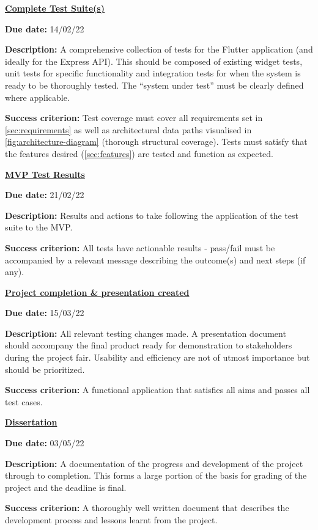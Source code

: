\textbf{\underline{Complete Test Suite(s)}}
\par
\textbf{Due date:} 14/02/22
\par
\vspace{-3mm}
\textbf{Description:} A comprehensive collection of tests for the Flutter application (and ideally for the Express API).
This should be composed of existing widget tests, unit tests for specific functionality and
integration tests for when the system is ready to be thoroughly tested. The ``system under test'' must be clearly defined where applicable.
\par
\vspace{-3mm}
\textbf{Success criterion:} Test coverage must cover all requirements set in \cref{sec:requirements} as well as architectural data paths
visualised in \cref{fig:architecture-diagram} (thorough structural coverage). Tests must satisfy that the features desired (\cref{sec:features}) are
tested and function as expected.
\par

\textbf{\underline{MVP Test Results}}
\par
\textbf{Due date:} 21/02/22
\par
\vspace{-3mm}
\textbf{Description:} Results and actions to take following the application of the test suite to the MVP.
\par
\vspace{-3mm}
\textbf{Success criterion:} All tests have actionable results - pass/fail must be accompanied by a relevant message describing
the outcome(s) and next steps (if any).
\par

\textbf{\underline{Project completion \& presentation created}}
\par
\textbf{Due date:} 15/03/22
\par
\vspace{-3mm}
\textbf{Description:} All relevant testing changes made. A presentation document should accompany the final product ready for demonstration
to stakeholders during the project fair. Usability and efficiency are not of utmost importance but should be prioritized.
\par
\vspace{-3mm}
\textbf{Success criterion:} A functional application that satisfies all aims and passes all test cases.
\par
\pagebreak

\textbf{\underline{Dissertation}}
\par
\textbf{Due date:} 03/05/22
\par
\vspace{-3mm}
\textbf{Description:} A documentation of the progress and development of the project through to completion. This forms a large portion of the basis
for grading of the project and the deadline is final.
\par
\vspace{-3mm}
\textbf{Success criterion:} A thoroughly well written document that describes the development process and lessons learnt from the project.

